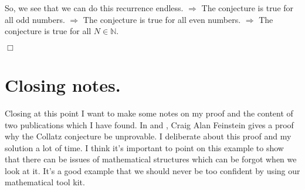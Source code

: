 \documentclass{aomart}
\theoremstyle{definition}
\begin{document}
So, we see that we can do this recurrence endless. $\Rightarrow$ The conjecture is true for all odd numbers. $\Rightarrow$ The conjecture is true for all even numbers. $\Rightarrow$ The conjecture is true for all $N \in \mathbb{N}$.
\begin{flushright} $\Box$ \end{flushright}
\section{Closing notes.}
\label{s:closnot}
Closing at this point I want to make some notes on my proof and the content of two publications which I have found. In \cite{Cpunp} and \cite{ComSS}, Craig Alan Feinstein gives a proof why the Collatz conjecture be unprovable. I deliberate about this proof and my solution a lot of time. I think it's important to point on this example to show that there can be issues of mathematical structures which can be forgot when we look at it. It's a good example that we should never be too confident by using our mathematical tool kit.
\nocite{*}


\end{document}
